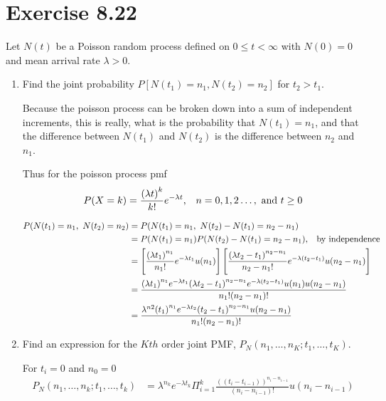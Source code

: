 \documentclass[12pt]{article}
\newcommand{\mysection}[1]{\section*{#1}}
\begin{document}
\mysection{Exercise 8.22} 
Let $N(t)$ be a Poisson random process defined on $0\leq t<\infty$ with $N(0)=0$ and mean arrival rate $\lambda > 0$.
\begin{enumerate}[label= (\alph*)]
  \item Find the joint probability $P[N(t_1)=n_1, N(t_2)=n_2]$ for $t_2> t_1$.

    Because the poisson process can be broken down into a sum of independent increments, this is really, what is the probability
    that $N(t_1)=n_1$, and that the difference between $N(t_1)$ and $N(t_2)$ is the difference between $n_2$ and $n_1$.

    Thus for the poisson process pmf
      \[ P(X=k)=\frac{{(\lambda t)}^k}{k!}e^{-\lambda t}\text{,\quad } n=0,1,2\ldots,\text{ and } t\geq 0 \]
    
    \begin{align*}
      P(N(t_1)=n_1,\ N(t_2)=n_2)&=P(N(t_1)=n_1,\ N(t_2)-N(t_1)=n_2-n_1)\\
                               &=P(N(t_1)=n_1) P(N(t_2)-N(t_1)=n_2-n_1)\text{,\quad by independence}\\
                               &=\left[\frac{{(\lambda t_1)}^{n_1}}{n_1!}e^{-\lambda t_1}u(n_1)\right] 
                                 \left[\frac{{(\lambda t_2 -t_1)}^{n_2 -n_1}}{n_2 - n_1!}e^{-\lambda (t_2 - t_1)}u(n_2-n_1)\right]\\
                               &=\frac{{(\lambda t_1)}^{n_1}e^{-\lambda t_1}{(\lambda t_2 -t_1)}^{n_2 -n_1}e^{-\lambda (t_2 - t_1)}u(n_1)  u(n_2-n_1)}{n_1!(n_2-n_1)!}\\
                               &=\frac{\lambda^{n2} {(t_1)}^{n_1}e^{-\lambda t_2}
                                      {(t_2 -t_1)}^{n_2 -n_1}{u(n_2-n_1)}}{n_1!(n_2-n_1)!}\\
    \end{align*}

  \item Find an expression for the $Kth$ order joint PMF, $ P_N(n_1,\ldots,n_K;t_1,\ldots,t_K)$.
 
    For $t_i=0$ and $n_0=0$
    \begin{align*}
      P_N(n_1,\ldots,n_k;t_1,\ldots,t_k)&=\lambda^{n_k}e^{-\lambda t_k}\Pi_{i=1}^k \frac{{((t_i-t_{i-1}))}^{n_i-n_{i-1}}}{(n_i-n_{i-1})!}u(n_i-n_{i-1}) \\
    \end{align*}
\end{enumerate}
\newpage
\end{document}
